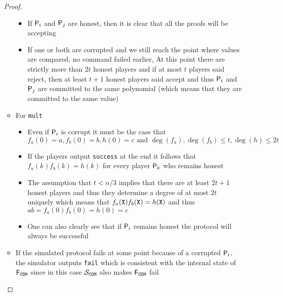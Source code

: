 \begin{itemize}
\begin{proof}
\begin{itemize}
      \begin{itemize}
        \item If $\P_i$ and $\P_j$ are honest, then it is clear that all the proofs will be accepting
        \item If one or both are corrupted and we still reach the point where values are compared, no command failed earlier, At this point there are strictly more than $2t$ honest players and if at most $t$ players said reject, then at least $t+1$ honest players said accept and thus $\P_i$ and $\P_j$ are committed to the same polynomial (which means that they are committed to the same value)
      \end{itemize}
      \item For \texttt{mult} 
      \begin{itemize}
      	\item Even if $\P_i$ is corrupt it must be the case that 
        \[
          f_a(0) = a, f_b(0) = b, h(0) = c \text{ and } \deg(f_a),\deg(f_b) \leq t, \deg(h) \leq 2t
        \]
        \item If the players output \texttt{success} at the end it follows that $f_a(k)f_b(k) = h(k)$ for every player $\P_k$ who remains honest
        \item The assumption that $t < n/3$ implies that there are at least $2t+1$ honest players and thus they determine a degree of at most $2t$ uniquely which means that $f_a(\X)f_b(\X) = h(\X)$ and thus $ab = f_a(0)f_b(0) = h(0) = c$
        \item One can also clearly see that if $\P_i$ remains honest the protocol will always be successful
      \end{itemize}
      \item If the simulated protocol fails at some point because of a corrupted $\P_i$, the simulator outputs \texttt{fail} which is consistent with the internal state of $\FCOM$ since in this case $\mathcal{S}_\COM$ also makes $\FCOM$ fail
    \end{itemize}
  \end{proof}
\end{itemize}

\newpage

